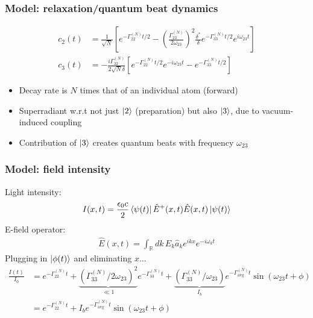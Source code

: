 \documentclass{beamer}
\theoremstyle{definition}
\newcommand{\lp}{\left(}
\newcommand{\rp}{\right)}
\newcommand{\lb}{\left[}
\newcommand{\rb}{\right]}
\newcommand{\f}[2]{\frac{#1}{#2}}
\begin{document}
\begin{frame}
	\frametitle{Model: relaxation/quantum beat dynamics}
	
	\begin{align*}
	c_2(t) &= \f{1}{\sqrt{N}} \lb e^{-\Gamma_{22}^{(N)} t/2} - \lp \f{\Gamma_{23}^{(N)}}{2\omega_{23}} \rp^2 \f{\delta^*}{\delta} e^{-\Gamma_{33}^{(N)}t/2} e^{i\omega_{23} t} \rb \\ 
	c_3(t) &= -\f{i\Gamma_{32}^{(N)}}{2\sqrt{N} \delta} \lb e^{-\Gamma_{22}^{(N)}t/2} e^{-i\omega_{23} t} - e^{-\Gamma_{33}^{(N)}t/2}  \rb
	\end{align*}
	
	\begin{itemize}
		\item Decay rate is $N$ times that of an individual atom (forward)
		\item Superradiant w.r.t not just $\ket{2}$ (preparation) but also $\ket{3}$, due to vacuum-induced coupling
		\item Contribution of $\ket{3}$ creates quantum beats with frequency $\omega_{23}$
	\end{itemize}
\end{frame}





\begin{frame}
	\frametitle{Model: field intensity}
	
	Light intensity:
	\begin{align*}
	I(x,t) = \f{\epsilon_0 c}{2} \bra{\psi(t)} \hat E^+(x,t) \hat E(x,t) \ket{\psi(t)}
	\end{align*}
	E-field operator:
	\begin{align*}
	\hat E(x,t) = \int_\mathbb{R} dk\, E_k \hat a_k e^{ikx} e^{-i\omega_k t}
	\end{align*}
	Plugging in $\ket{\phi(t)}$ and eliminating $x$...
	\begin{align*}
	\f{I(t)}{I_0} &= e^{-\Gamma_{22}^{(N)}t} + \underbrace{\lp \Gamma_{33}^{(N)}/2\omega_{23} \rp^2}_{\ll 1} e^{-\Gamma_{33}^{(N)} t} + \underbrace{\lp\Gamma_{33}^{(N)}/\omega_{23} \rp}_{I_b}e^{-\Gamma_{\text{avg}}^{(N)}t} \sin(\omega_{23}t + \phi) \\
	&= e^{-\Gamma_{22}^{(N)}t} + I_b e^{-\Gamma_{\text{avg}}^{(N)}t} \sin(\omega_{23}t + \phi)
	\end{align*}
\end{frame}
\end{document}
